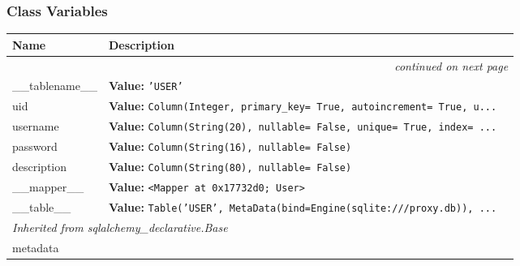
  \subsubsection{Class Variables}

    \vspace{-1cm}
\hspace{\varindent}\begin{longtable}{|p{\varnamewidth}|p{\vardescrwidth}|l}
\cline{1-2}
\cline{1-2} \centering \textbf{Name} & \centering \textbf{Description}& \\
\cline{1-2}
\endhead\cline{1-2}\multicolumn{3}{r}{\small\textit{continued on next page}}\\\endfoot\cline{1-2}
\endlastfoot\raggedright \_\-\_\-t\-a\-b\-l\-e\-n\-a\-m\-e\-\_\-\_\- & \raggedright \textbf{Value:} 
{\tt \texttt{'}\texttt{USER}\texttt{'}}&\\
\cline{1-2}
\raggedright u\-i\-d\- & \raggedright \textbf{Value:} 
{\tt Column(Integer, primary\_key= True, autoincrement= True, u\texttt{...}}&\\
\cline{1-2}
\raggedright u\-s\-e\-r\-n\-a\-m\-e\- & \raggedright \textbf{Value:} 
{\tt Column(String(20), nullable= False, unique= True, index= \texttt{...}}&\\
\cline{1-2}
\raggedright p\-a\-s\-s\-w\-o\-r\-d\- & \raggedright \textbf{Value:} 
{\tt Column(String(16), nullable= False)}&\\
\cline{1-2}
\raggedright d\-e\-s\-c\-r\-i\-p\-t\-i\-o\-n\- & \raggedright \textbf{Value:} 
{\tt Column(String(80), nullable= False)}&\\
\cline{1-2}
\raggedright \_\-\_\-m\-a\-p\-p\-e\-r\-\_\-\_\- & \raggedright \textbf{Value:} 
{\tt {\textless}Mapper at 0x17732d0; User{\textgreater}}&\\
\cline{1-2}
\raggedright \_\-\_\-t\-a\-b\-l\-e\-\_\-\_\- & \raggedright \textbf{Value:} 
{\tt Table('USER', MetaData(bind=Engine(sqlite:///proxy.db)), \texttt{...}}&\\
\cline{1-2}
\multicolumn{2}{|l|}{\textit{Inherited from sqlalchemy\_declarative.Base}}\\
\multicolumn{2}{|p{\varwidth}|}{\raggedright metadata}\\
\cline{1-2}
\end{longtable}

